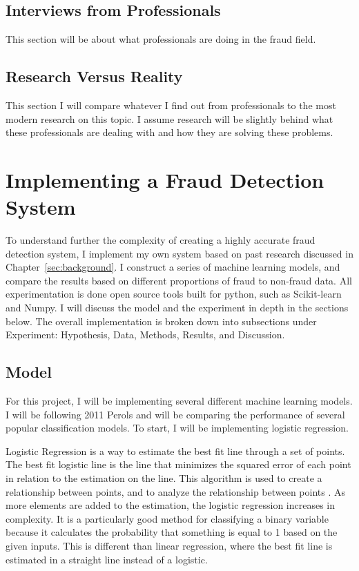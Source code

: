 \documentclass[midd]{thesis}
\begin{document}
\section{ Interviews from Professionals}

This section will be about what professionals are doing in the fraud field.

\section{ Research Versus Reality}

This section I will compare whatever I find out from professionals to the most modern research on this topic. I assume research will be slightly behind what these professionals are dealing with and how they are solving these problems.


\pagebreak
\chapter{Implementing a Fraud Detection System}
\label{sec:impl}

To understand further the complexity of creating a highly accurate fraud detection system, I implement my own system based on past research discussed in Chapter~\ref{sec:background}. I construct a series of machine learning models, and compare the results based on different proportions of fraud to non-fraud data. All experimentation is done open source tools built for python, such as Scikit-learn and Numpy. I will discuss the model and the experiment in depth in the sections below. The overall implementation is broken down into subsections under Experiment: Hypothesis, Data, Methods, Results, and Discussion. 

\section{Model} %

For this project, I will be implementing several different machine learning models. I will be following 2011 Perols and will be comparing the performance of several popular classification models. To start, I will be implementing logistic regression.

Logistic Regression is a way to estimate the best fit line through a set of points. The best fit logistic line is the line that minimizes the squared error of each point in relation to the estimation on the line. This algorithm is used to create a relationship between points, and to analyze the relationship between points \cite{Swaminathan}. As more elements are added to the estimation, the logistic regression increases in complexity. It is a particularly good method for classifying a binary variable because it calculates the probability that something is equal to 1 based on the given inputs. This is different than linear regression, where the best fit line is estimated in a straight line instead of a logistic.
\end{document}
